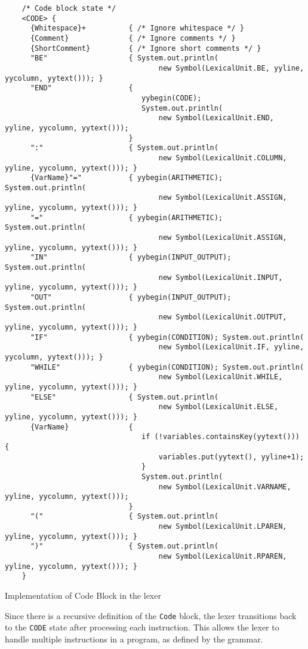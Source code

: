     \begin{verbatim}
	/* Code block state */
	<CODE> {
	  {Whitespace}+          { /* Ignore whitespace */ }
	  {Comment}              { /* Ignore comments */ }
	  {ShortComment}         { /* Ignore short comments */ }
	  "BE"                   { System.out.println(
									new Symbol(LexicalUnit.BE, yyline, yycolumn, yytext())); }
	  "END"                  {
								yybegin(CODE);
								System.out.println(
									new Symbol(LexicalUnit.END, yyline, yycolumn, yytext()));
						     }
	  ":"                    { System.out.println(
									new Symbol(LexicalUnit.COLUMN, yyline, yycolumn, yytext())); }
	  {VarName}"="           { yybegin(ARITHMETIC); System.out.println(
									new Symbol(LexicalUnit.ASSIGN, yyline, yycolumn, yytext())); }
	  "="                    { yybegin(ARITHMETIC); System.out.println(
									new Symbol(LexicalUnit.ASSIGN, yyline, yycolumn, yytext())); }
	  "IN"                   { yybegin(INPUT_OUTPUT); System.out.println(
									new Symbol(LexicalUnit.INPUT, yyline, yycolumn, yytext())); }
	  "OUT"                  { yybegin(INPUT_OUTPUT); System.out.println(
									new Symbol(LexicalUnit.OUTPUT, yyline, yycolumn, yytext())); }
	  "IF"                   { yybegin(CONDITION); System.out.println(
									new Symbol(LexicalUnit.IF, yyline, yycolumn, yytext())); }
	  "WHILE"                { yybegin(CONDITION); System.out.println(
									new Symbol(LexicalUnit.WHILE, yyline, yycolumn, yytext())); }
	  "ELSE"                 { System.out.println(
									new Symbol(LexicalUnit.ELSE, yyline, yycolumn, yytext())); }
	  {VarName}              {
								if (!variables.containsKey(yytext())) {
									variables.put(yytext(), yyline+1);
								}
								System.out.println(
									new Symbol(LexicalUnit.VARNAME, yyline, yycolumn, yytext()));
							 }
	  "("                    { System.out.println(
									new Symbol(LexicalUnit.LPAREN, yyline, yycolumn, yytext())); }
	  ")"                    { System.out.println(
									new Symbol(LexicalUnit.RPAREN, yyline, yycolumn, yytext())); }
	}
	\end{verbatim}

    \begin{table}[h]
		\centering
		\caption{Implementation of Code Block in the lexer}
	\end{table}

	Since there is a recursive definition of the \texttt{Code} block, the lexer transitions back to the \texttt{CODE} state after processing each instruction. This allows the lexer to handle multiple instructions in a program, as defined by the grammar.\\

